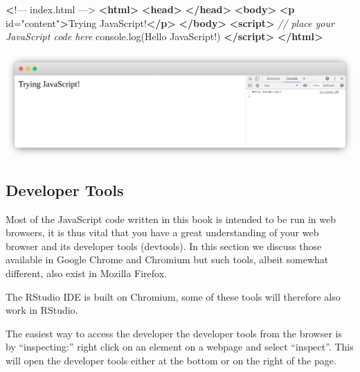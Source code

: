 \documentclass[
]{krantz}
\makeatletter
\newenvironment{Shaded}{\begin{snugshade}}{\end{snugshade}}
\newcommand{\AttributeTok}[1]{\textcolor[rgb]{0.61,0.61,0.61}{#1}}
\newcommand{\CommentTok}[1]{\textcolor[rgb]{0.37,0.37,0.37}{\textit{#1}}}
\newcommand{\ErrorTok}[1]{\textcolor[rgb]{0.14,0.14,0.14}{\textbf{#1}}}
\newcommand{\KeywordTok}[1]{\textcolor[rgb]{0.27,0.27,0.27}{\textbf{#1}}}
\newcommand{\NormalTok}[1]{#1}
\newcommand{\OtherTok}[1]{\textcolor[rgb]{0.37,0.37,0.37}{#1}}
\newcommand{\StringTok}[1]{\textcolor[rgb]{0.5,0.5,0.5}{#1}}
\newcommand{\VariableTok}[1]{\textcolor[rgb]{0,0,0}{#1}}
\newenvironment{kframe}{%
\medskip{}
\setlength{\fboxsep}{.8em}
 \def\at@end@of@kframe{}%
 \ifinner\ifhmode%
  \def\at@end@of@kframe{\end{minipage}}%
  \begin{minipage}{\columnwidth}%
 \fi\fi%
 \def\FrameCommand##1{\hskip\@totalleftmargin \hskip-\fboxsep
 \colorbox{shadecolor}{##1}\hskip-\fboxsep
     \hskip-\linewidth \hskip-\@totalleftmargin \hskip\columnwidth}%
 \MakeFramed {\advance\hsize-\width
   \@totalleftmargin\z@ \linewidth\hsize
   \@setminipage}}%
 {\par\unskip\endMakeFramed%
 \at@end@of@kframe}
\renewenvironment{Shaded}{\begin{kframe}}{\end{kframe}}
\newenvironment{rmdblock}[1]
  {
  \begin{itemize}
  \renewcommand{\labelitemi}{
    \raisebox{-.7\height}[0pt][0pt]{
      {\setkeys{Gin}{width=3em,keepaspectratio}\texttt{[image: images/\#1]}}
    }
  }
  \setlength{\fboxsep}{1em}
  \begin{kframe}
  \item
  }
  {
  \end{kframe}
  \end{itemize}
  }
\newenvironment{rmdnote}
  {\begin{rmdblock}{note}}
  {\end{rmdblock}}
\makeatother
\begin{document}
\begin{Shaded}
\begin{Highlighting}[]
\ErrorTok{<}\NormalTok{!–– index.html ––>}
\KeywordTok{<html>}
  \KeywordTok{<head>}
  \KeywordTok{</head>}
  \KeywordTok{<body>}
    \KeywordTok{<p}\OtherTok{ id=}\StringTok{"content"}\KeywordTok{>}\NormalTok{Trying JavaScript!}\KeywordTok{</p>}
  \KeywordTok{</body>}
  \KeywordTok{<script>}
    \CommentTok{// place your JavaScript code here}
    \VariableTok{console}\NormalTok{.}\AttributeTok{log}\NormalTok{(}\StringTok{\textquotesingle{}Hello JavaScript!\textquotesingle{}}\NormalTok{)}
  \KeywordTok{</script>}
\KeywordTok{</html>}
\end{Highlighting}
\end{Shaded}

\includegraphics{images/tryingjs.png}

\hypertarget{basics-chrome-devtools}{%
\subsection{Developer Tools}\label{basics-chrome-devtools}}

Most of the JavaScript code written in this book is intended to be run in web browsers, it is thus vital that you have a great understanding of your web browser and its developer tools (devtools). In this section we discuss those available in Google Chrome and Chromium but such tools, albeit somewhat different, also exist in Mozilla Firefox.

\begin{rmdnote}
The RStudio IDE is built on Chromium, some of these tools will therefore
also work in RStudio.
\end{rmdnote}

The easiest way to access the developer the developer tools from the browser is by ``inspecting:'' right click on an element on a webpage and select ``inspect''. This will open the developer tools either at the bottom or on the right of the page.
\end{document}
